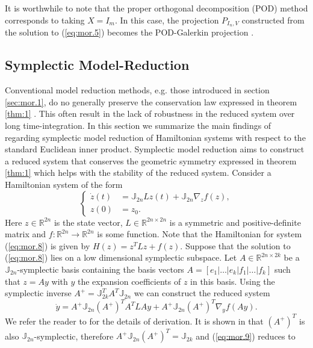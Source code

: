 It is worthwhile to note that the proper orthogonal decomposition (POD) method \cite{hesthaven2015certified} corresponds to taking $X = I_m$. In this case, the projection $P_{I_n,V}$ constructed from the solution to (\ref{eq:mor.5}) becomes the POD-Galerkin projection \cite{hesthaven2015certified}.

\subsection{Symplectic Model-Reduction} \label{sec:mor.2}
Conventional model reduction methods, e.g. those introduced in section \ref{sec:mor.1}, do no generally preserve the conservation law expressed in theorem \ref{thm:1} . This often result in the lack of robustness in the reduced system over long time-integration. In this section we summarize the main findings of \cite{doi:10.1137/17M1111991} regarding symplectic model reduction of Hamiltonian systems with respect to the standard Euclidean inner product. Symplectic model reduction aims to construct a reduced system that conserves the geometric symmetry expressed in theorem \ref{thm:1} which helps with the stability of the reduced system.
Consider a Hamiltonian system of the form
\begin{equation} \label{eq:mor.8}
\left\{
\begin{aligned}
	\dot z(t) &= \mathbb J_{2n} L z(t) + \mathbb J_{2n} \nabla_z f(z), \\
	z(0) &= z_0.
\end{aligned}
\right.
\end{equation}
Here $z\in \mathbb R^{2n}$ is the state vector, $L\in\mathbb R^{2n\times 2n}$ is a symmetric and positive-definite matrix and $f:\mathbb R^{2n}\to\mathbb R^{2n}$ is some function. Note that the Hamiltonian for system (\ref{eq:mor.8}) is given by $H(z) = z^TLz + f(z)$. Suppose that the solution to (\ref{eq:mor.8}) lies on a low dimensional symplectic subspace. Let $A\in \mathbb{R}^{2n\times 2k}$ be a $\mathbb{J}_{2n}$-symplectic basis containing the basis vectors $A=[e_1|\dots|e_k|f_1|\dots|f_k]$ such that $z = Ay$ with $y$ the expansion coefficients of $z$ in this basis. Using the symplectic inverse $A^+ = \mathbb J_{2k}^T A^T \mathbb J_{2n}$ we can construct the reduced system
\begin{equation} \label{eq:mor.9}
	\dot y = A^+ \mathbb J_{2n} (A^+)^T A^T L A y + A^+ \mathbb J_{2n} (A^+)^T \nabla_y f(Ay).
\end{equation}
We refer the reader to \cite{doi:10.1137/17M1111991} for the details of derivation. It is shown in \cite{doi:10.1137/140978922} that $(A^+)^T$ is also $\mathbb J_{2n}$-symplectic, therefore $A^+ \mathbb J_{2n} (A^+)^T = \mathbb J_{2k}$ and (\ref{eq:mor.9}) reduces to
